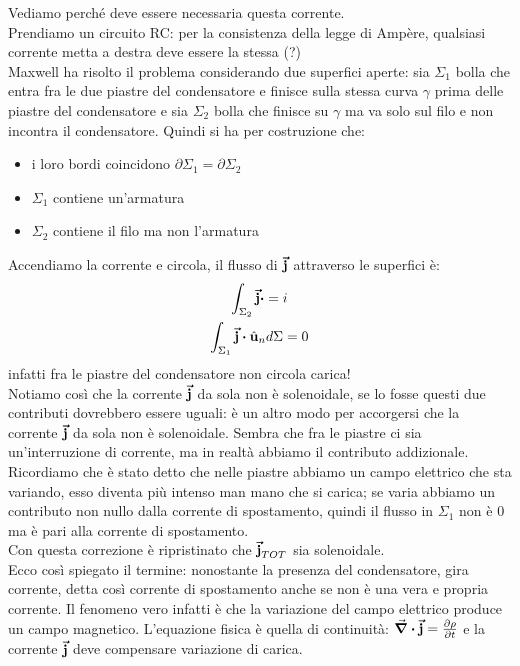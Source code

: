 Vediamo perché deve essere necessaria questa corrente.\\
Prendiamo un circuito RC: per la consistenza della legge di Ampère, qualsiasi corrente metta a destra deve essere la stessa (?)\\
Maxwell ha risolto il problema considerando due superfici aperte: sia $\Sigma_1$ bolla che entra fra le due piastre del condensatore e finisce sulla stessa curva $\gamma$ prima delle piastre del condensatore e sia $\Sigma_2$ bolla che finisce su $\gamma$ ma va solo sul filo e non incontra il condensatore. Quindi si ha per costruzione che:
\begin{itemize}
	\item i loro bordi coincidono $\partial\Sigma_1=\partial\Sigma_2$
	\item $\Sigma_1$ contiene un'armatura
	\item $\Sigma_2$ contiene il filo ma non l'armatura
\end{itemize}
Accendiamo la corrente e circola, il flusso di $\vb*{\va{j}}$ attraverso le superfici è:
\begin{gather*}
	\int_{\Sigma_2}\vba j\vdot =i\\
	\int_{\Sigma_1} \vba j\vdot\vbh u_n d\Sigma =0
\end{gather*}
infatti fra le piastre del condensatore non circola carica!\\
Notiamo così che la corrente $\vb*{\va{j}}$ da sola non è solenoidale, se lo fosse questi due contributi dovrebbero essere uguali: è un altro modo per accorgersi che la corrente $\vb*{\va{j}}$ da sola non è solenoidale. Sembra che fra le piastre ci sia un'interruzione di corrente, ma in realtà abbiamo il contributo addizionale. \\
Ricordiamo che è stato detto che nelle piastre abbiamo un campo elettrico che sta variando, esso diventa più intenso man mano che si carica; se varia abbiamo un contributo non nullo dalla corrente di spostamento, quindi il flusso in $\Sigma_1$ non è $0$ ma è pari alla corrente di spostamento.\\
Con questa correzione è ripristinato che $\vb*{\va{j}}_{TOT}$ sia solenoidale.\\
Ecco così spiegato il termine: nonostante la presenza del condensatore, gira corrente, detta così corrente di spostamento anche se non è una vera e propria corrente. Il fenomeno vero infatti è che la variazione del campo elettrico produce un campo magnetico. L'equazione fisica è quella di continuità: $\div\vb*{\va{j}}=\pdv{\rho}{t}$ e la corrente $\vb*{\va{j}}$ deve compensare variazione di carica.\\

